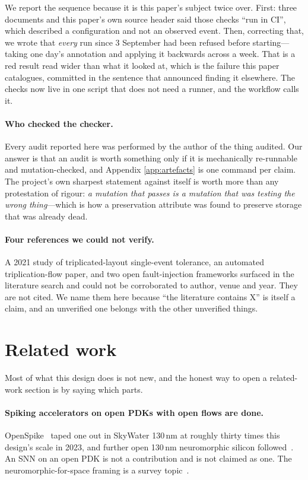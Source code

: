 \documentclass[11pt,a4paper]{article}
\begin{document}
We report the sequence because it is this paper's subject twice over.
First: three documents and this paper's own source header said those
checks ``run in CI'', which described a configuration and not an
observed event. Then, correcting that, we wrote that \emph{every} run
since 3 September had been refused before starting---taking one day's
annotation and applying it backwards across a week. That is a red result
read wider than what it looked at, which is the failure this paper
catalogues, committed in the sentence that announced finding it
elsewhere. The checks now live in one script that does not need a
runner, and the workflow calls it.

\paragraph{Who checked the checker.}
Every audit reported here was performed by the author of the thing
audited. Our answer is that an audit is worth something only if it is
mechanically re-runnable and mutation-checked, and Appendix
\ref{app:artefacts} is one command per claim. The project's own sharpest
statement against itself is worth more than any protestation of rigour:
\emph{a mutation that passes is a mutation that was testing the wrong
thing}---which is how a preservation attribute was found to preserve
storage that was already dead.

\paragraph{Four references we could not verify.}
A 2021 study of triplicated-layout single-event tolerance, an automated
triplication-flow paper, and two open fault-injection frameworks surfaced
in the literature search and could not be corroborated to author, venue
and year. They are not cited. We name them here because ``the literature
contains X'' is itself a claim, and an unverified one belongs with the
other unverified things.

\section{Related work}
\label{sec:related}

Most of what this design does is not new, and the honest way to open a
related-work section is by saying which parts.

\paragraph{Spiking accelerators on open PDKs with open flows are done.}
OpenSpike~\cite{openspike2023} taped one out in SkyWater 130\,nm at
roughly thirty times this design's scale in 2023, and further open
130\,nm neuromorphic silicon followed~\cite{kumaresan2026}. An SNN on an
open PDK is not a contribution and is not claimed as one. The
neuromorphic-for-space framing is a survey topic~\cite{naoukin2023}.
\end{document}

